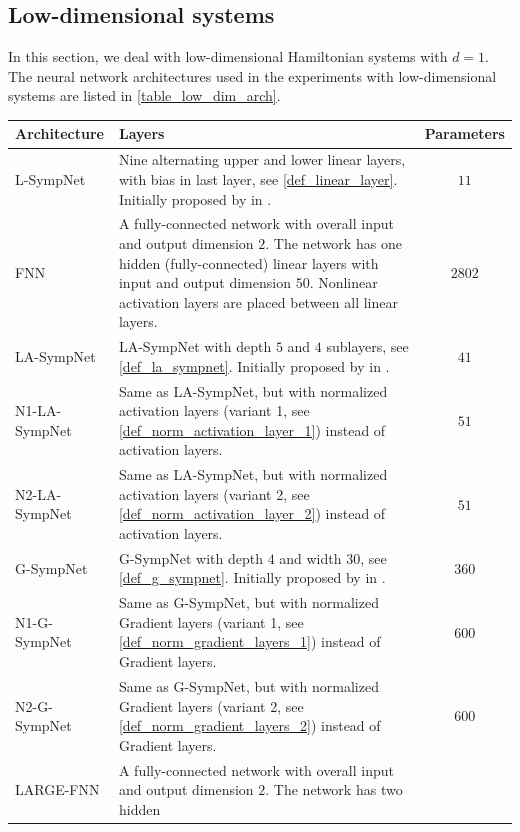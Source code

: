 \documentclass[twoside,a4paper]{article}
\begin{document}
\subsection{Low-dimensional systems}

In this section, we deal with low-dimensional Hamiltonian systems with $d=1$.
The neural network architectures used in the experiments with low-dimensional systems
are listed in \cref{table_low_dim_arch}.
\begin{table}
	\centering
	\begin{tabular}{lp{8cm}c}
		\toprule Architecture & Layers & Parameters \\
		\midrule L-SympNet & Nine alternating upper and lower linear layers,
		with bias in last layer, see \cref{def_linear_layer}.
		Initially proposed by \citeauthor{Jin2020} in \cite{Jin2020}.
		& $11$ \\
		FNN & 
		A fully-connected network with overall input and output dimension $2$. The network has one hidden
		(fully-connected) linear layers with input and output dimension $50$.
		Nonlinear activation layers are placed between all linear layers.
		& $2802$ \\
		LA-SympNet & LA-SympNet with depth $5$ and $4$ sublayers, see \cref{def_la_sympnet}.
		Initially proposed by \citeauthor{Jin2020} in \cite{Jin2020}.
		& $41$ \\
		N1-LA-SympNet & 
		Same as LA-SympNet, but with normalized activation layers (variant 1, 
		see \cref{def_norm_activation_layer_1}) instead of activation layers.
		& $51$ \\
		N2-LA-SympNet & 
		Same as LA-SympNet, but with normalized activation layers (variant 2, 
		see \cref{def_norm_activation_layer_2}) instead of activation layers.
		& $51$ \\
		G-SympNet & G-SympNet with depth $4$ and width $30$, see \cref{def_g_sympnet}.
		Initially proposed by \citeauthor{Jin2020} in \cite{Jin2020}.
		& $360$ \\
		N1-G-SympNet & 
		Same as G-SympNet, but with normalized Gradient layers 
		(variant 1, see \cref{def_norm_gradient_layers_1}) instead of Gradient layers.
		& $600$ \\
		N2-G-SympNet & 
		Same as G-SympNet, but with normalized Gradient layers 
		(variant 2, see \cref{def_norm_gradient_layers_2}) instead of Gradient layers. 
		& $600$ \\
		LARGE-FNN &
		A fully-connected network with overall input and output dimension $2$. The network has two hidden

\end{tabular}
\end{table}
\end{document}
